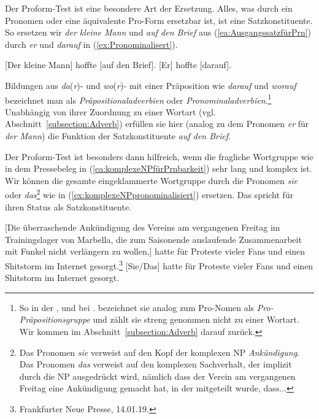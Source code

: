 Der Proform-Test ist eine besondere Art der Ersetzung. Alles, was durch ein Pronomen oder eine äquivalente Pro-Form ersetzbar ist, ist eine Satzkonstituente. So ersetzen wir \textit{der kleine Mann} und \textit{auf den Brief} aus (\ref{ea:AusgangssatzfürPrn}) durch \textit{er} und \textit{darauf} in (\ref{ex:Pronominalisert}). 

\ea \label{ea:Pronominalisierung}
\ea \label{ea:AusgangssatzfürPrn} [Der kleine Mann] hoffte [auf den Brief].
\ex \label{ex:Pronominalisert} [Er] hoffte [darauf].
\z 
\z 

Bildungen aus \textit{da}(\textit{r})- und \textit{wo}(\textit{r})- mit einer Präposition wie \textit{darauf} und \textit{worauf} bezeichnet man als \textit{Präpositionaladverbien} oder \textit{Pronominaladverbien}.\footnote{So in der \citet[803, §1413]{Duden2022}, \citet[206]{Eisenberg2020_Satz} und bei \citet[236]{HelbigBuscha}. \citet[731]{Agel2017} bezeichnet sie analog zum Pro-Nomen als \textit{Pro-Präpositionsgruppe} und zählt sie streng genommen nicht zu einer Wortart. Wir kommen im Abschnitt~\ref{subsection:Adverb} darauf zurück.} Unabhängig von ihrer Zuordnung zu einer Wortart (vgl. Abschnitt~\ref{subsection:Adverb}) erfüllen sie hier (analog zu dem Pronomen \textit{er} für \textit{der Mann}) die Funktion der Satzkonstituente \textit{auf den Brief}.   


Der Proform-Test ist besonders dann hilfreich, wenn die fragliche Wortgruppe wie in dem Pressebeleg in (\ref{ea:komplexeNPfürPrnbarkeit}) sehr lang und komplex ist. Wir können die gesamte eingeklammerte Wortgruppe durch die Pronomen \textit{sie} oder \textit{das}\footnote{Das Pronomen \textit{sie} verweist auf den Kopf der komplexen NP \textit{Ankündigung}. Das Pronomen \textit{das} verweist auf den komplexen Sachverhalt, der implizit durch die NP ausgedrückt wird, nämlich dass der Verein am vergangenen Freitag eine Ankündigung gemacht hat, in der mitgeteilt wurde, dass...} wie in (\ref{ex:komplexeNPpronominalisiert}) ersetzen. Das spricht für ihren Status als Satzkonstituente.


\ea \label{ea:komplexeNPpronominalisierbar}
\ea \label{ea:komplexeNPfürPrnbarkeit} [Die überraschende Ankündigung des Vereins am vergangenen Freitag im Trainingslager von Marbella, die zum Saisonende auslaufende Zusammenarbeit mit Funkel nicht verlängern zu wollen,] hatte für Proteste vieler Fans und einen Shitstorm im Internet gesorgt.\footnote{Frankfurter Neue Presse, 14.01.19.} 
\ex \label{ex:komplexeNPpronominalisiert} [Sie/Das] hatte für Proteste vieler Fans und einen Shitstorm im Internet gesorgt.
\z 
\z 

